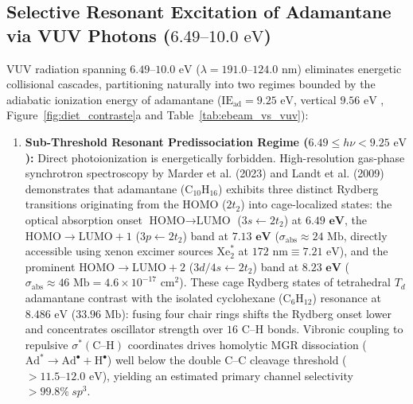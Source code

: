 \documentclass[10pt,twocolumn,a4paper]{article}
\begin{document}
\subsection{Selective Resonant Excitation of Adamantane via VUV Photons ($6.49\text{--}10.0\text{ eV}$)}
VUV radiation spanning $6.49\text{--}10.0\text{ eV}$ ($\lambda = 191.0\text{--}124.0\text{ nm}$) eliminates energetic collisional cascades, partitioning naturally into two regimes bounded by the adiabatic ionization energy of adamantane ($\text{IE}_{\text{ad}} = 9.25\text{ eV}$, vertical $9.56\text{ eV}$ \cite{Landt2009,Marder2023}, Figure~\ref{fig:diet_contraste}a and Table~\ref{tab:ebeam_vs_vuv}):
\begin{enumerate}
    \item \textbf{Sub-Threshold Resonant Predissociation Regime ($6.49 \le h\nu < 9.25\text{ eV}$):} Direct photoionization is energetically forbidden. High-resolution gas-phase synchrotron spectroscopy by Marder et al. (2023) \cite{Marder2023} and Landt et al. (2009) \cite{Landt2009} demonstrates that adamantane ($\text{C}_{10}\text{H}_{16}$) exhibits three distinct Rydberg transitions originating from the $\text{HOMO}$ ($2t_2$) into cage-localized states: the optical absorption onset $\text{HOMO}\to\text{LUMO}$ ($3s \leftarrow 2t_2$) at $\mathbf{6.49\text{ eV}}$, the $\text{HOMO}\to\text{LUMO}+1$ ($3p \leftarrow 2t_2$) band at $\mathbf{7.13\text{ eV}}$ ($\sigma_{\text{abs}} \approx 24\text{ Mb}$, directly accessible using xenon excimer sources $\text{Xe}_2^*$ at $172\text{ nm} \equiv 7.21\text{ eV}$), and the prominent $\text{HOMO}\to\text{LUMO}+2$ ($3d/4s \leftarrow 2t_2$) band at $\mathbf{8.23\text{ eV}}$ ($\sigma_{\text{abs}} \approx 46\text{ Mb} = 4.6 \times 10^{-17}\text{ cm}^2$). These cage Rydberg states of tetrahedral $T_d$ adamantane contrast with the isolated cyclohexane ($\text{C}_6\text{H}_{12}$) resonance at $8.486\text{ eV}$ ($33.96\text{ Mb}$): fusing four chair rings shifts the Rydberg onset lower and concentrates oscillator strength over $16$ $\text{C--H}$ bonds. Vibronic coupling to repulsive $\sigma^*(\text{C--H})$ coordinates drives homolytic MGR dissociation ($\text{Ad}^* \to \text{Ad}^\bullet + \text{H}^\bullet$) well below the double $\text{C--C}$ cleavage threshold ($>11.5\text{--}12.0\text{ eV}$), yielding an estimated primary channel selectivity $>99.8\%\ sp^3$.

\end{enumerate}
\end{document}
